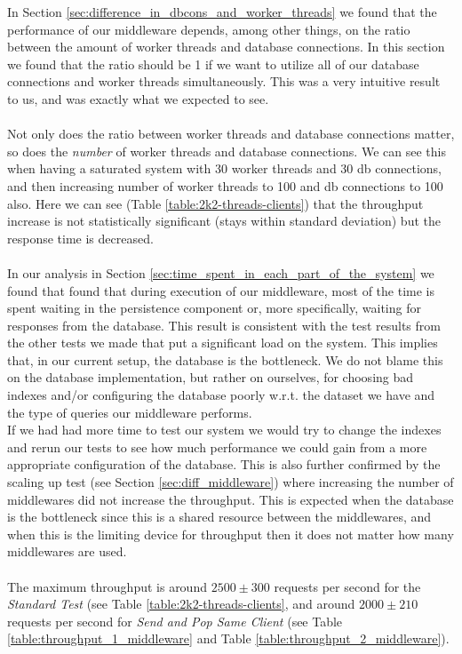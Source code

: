 \documentclass{article}
\begin{document}
        In Section \ref{sec:difference_in_dbcons_and_worker_threads} we found that the performance of our middleware depends, among other things, on the ratio between the amount of worker threads and database connections. In this section we found that the ratio should be 1 if we want to utilize all of our database connections and worker threads simultaneously. This was a very intuitive result to us, and was exactly what we expected to see.\\
        \\
        Not only does the ratio between worker threads and database connections matter, so does the \textit{number} of worker threads and database connections. We can see this when having a saturated system with 30 worker threads and 30 db connections, and then increasing number of worker threads to 100 and db connections to 100 also. Here we can see (Table \ref{table:2k2-threads-clients}) that the throughput increase is not statistically significant (stays within standard deviation) but the response time is decreased.\\
        \\
        In our analysis in Section \ref{sec:time_spent_in_each_part_of_the_system} we found that found that during execution of our middleware, most of the time is spent waiting in the persistence component or, more specifically, waiting for responses from the database. This result is consistent with the test results from the other tests we made that put a significant load on the system. This implies that, in our current setup, the database is the bottleneck. We do not blame this on the database implementation, but rather on ourselves, for choosing bad indexes and/or configuring the database poorly w.r.t. the dataset we have and the type of queries our middleware performs.\\
        If we had had more time to test our system we would try to change the indexes and rerun our tests to see how much performance we could gain from a more appropriate configuration of the database. This is also further confirmed by the scaling up test (see Section \ref{sec:diff_middleware}) where increasing the number of middlewares did not increase the throughput. This is expected when the database is the bottleneck since this is a shared resource between the middlewares, and when this is the limiting device for throughput then it does not matter how many middlewares are used.\\
        \\
        The maximum throughput is around $2500 \pm 300$ requests per second for the \textit{Standard Test} (see Table \ref{table:2k2-threads-clients}, and around $2000 \pm 210$ requests per second for \textit{Send and Pop Same Client} (see Table \ref{table:throughput_1_middleware} and Table \ref{table:throughput_2_middleware}).\\
\end{document}
